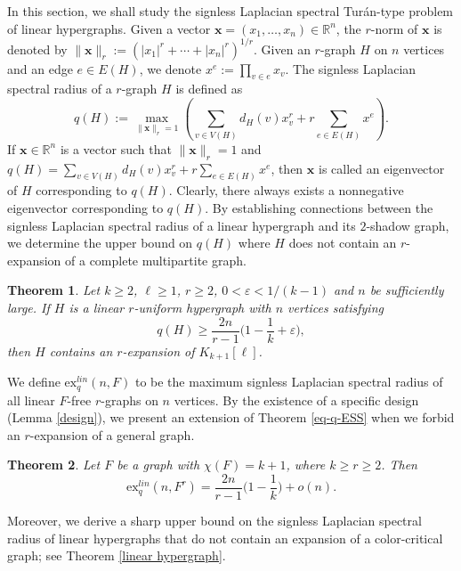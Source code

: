 \documentclass[11pt,a4paper]{article}
\theoremstyle{plain}
\newtheorem{theorem}{Theorem}[section]
\theoremstyle{definition}
\begin{document}
  In this section, we shall study the signless Laplacian spectral Tur\'an-type problem of linear hypergraphs. 
Given a vector $\mathbf{x}=(x_{1},\ldots,x_{n})\in \mathbb{R}^{n}$, the $r$-norm of $\mathbf{x}$ is denoted by  $\|\mathbf{x}\|_{r}:=(|x_{1}|^{r}+\cdots +|x_{n}|^{r})^{1/r}$. 
Given an $r$-graph $H$ on $n$ vertices and an edge $e\in E(H)$, we denote $x^{e}:=\prod_{v\in e}x_{v}$. The {signless Laplacian spectral radius} of a $r$-graph $H$ is defined as
$$q(H):=\max_{\|\mathbf{x}\|_{r}=1} \left( \sum_{v\in V(H)}d_{H}(v)x_{v}^{r}+  r\sum_{e\in E(H)}x^{e}\right).$$ 
If $\mathbf{x}\in \mathbb{R}^{n}$ is a vector such that $\|\mathbf{x}\|_{r}=1$ and
$q(H)=\sum_{v\in V(H)}d_{H}(v)x_{v}^{r}+  r\sum_{e\in E(H)}x^{e}$, then $\mathbf{x}$ is called an  {eigenvector} of $H$ corresponding to $q(H)$. Clearly, there always exists a nonnegative eigenvector corresponding to $q(H)$. 
 {By establishing  connections between the signless Laplacian spectral radius of a linear hypergraph and its $2$-shadow graph,} 
 we determine the upper bound on $q(H)$ where $H$ does not contain an $r$-expansion of a complete multipartite graph.  



 
\begin{theorem}\label{lhslES}
Let $k\geq 2$, $\ell \ge 1$, $r\geq2$, $0<\varepsilon<1/(k-1)$ and $n$ be sufficiently large. If $H$ is a linear $r$-uniform hypergraph with $n$ vertices satisfying
$$q(H)\geq \frac{2n}{r-1}\bigg(1-\frac{1}{k}+ \varepsilon \bigg),$$
then $H$ contains an $r$-expansion of $K_{k+1}[\ell]$.
\end{theorem}
 


We define $\mathrm{ex}_{q}^{lin}(n,F)$ to be the maximum signless Laplacian spectral radius of all linear $F$-free $r$-graphs on $n$ vertices. 
By the existence of a specific design (Lemma \ref{design}),  
we present an extension of Theorem \ref{eq-q-ESS} when we forbid an $r$-expansion of a general graph.



\begin{theorem}\label{ESSL}
Let $F$ be a graph with $\chi(F)=k+1$, where $k\geq r\geq2$. Then
$$\mathrm{ex}_{q}^{lin}(n,F^{r})=\frac{2n}{r-1} 
\bigg(1-\frac{1}{k}\bigg)+o(n).$$
\end{theorem}





Moreover, we derive a sharp upper bound on the  signless Laplacian spectral radius of linear hypergraphs that do not contain an expansion of a color-critical graph; see Theorem \ref{linear hypergraph}. 
\end{document}
